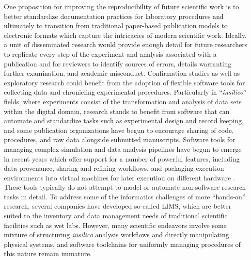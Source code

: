 \documentclass[../thesis]{subfiles}
\begin{document}
One proposition for improving the reproducibility of future scientific
work is to better standardize documentation practices for laboratory
procedures \cite{10.1371/journal.pmed.0020124} and ultimately to
transition from traditional paper-based publication models to
electronic formats which capture the intricacies of modern scientific
work. Ideally, a unit of disseminated research would provide enough
detail for future researchers to replicate every step of the
experiment and analysis associated with a publication and for
reviewers to identify sources of errors, details warranting further
examination, and academic misconduct. Confirmation studies as well as
exploratory research could benefit from the adoption of flexible
software tools for collecting data and chronicling experimental
procedures. Particularly in ``\textit{\gls{insilico}}'' fields, where
experiments consist of the transformation and analysis of data sets
within the digital domain, research stands to benefit from
software that can automate and standardize tasks such as
experimental design and record keeping, and some publication
organizations have begun to encourage sharing of code, procedures, and
raw data alongside submitted manuscripts.
Software tools for managing complex simulation and data analysis
pipelines have begun to emerge in recent years which offer support for a number of powerful features,
including data provenance, sharing and refining workflows, and
packaging execution environments into virtual machines for
later execution on different hardware \cite{VisTrails, Taverna}.
These tools typically do not attempt to model or automate non-software
research tasks in detail.
To address some of the informatics challenges of more ``hands-on''
research, several companies have developed
so-called \gls{LIMS}, which are
better suited to the inventory and data management needs of
traditional scientific facilities such as wet labs.
However, many scientific endeavors involve some mixture of
structuring \textit{\gls{insilico}} analysis workflows and directly
manipulating physical systems, and software toolchains for uniformly
managing procedures of this nature remain immature.
\end{document}

